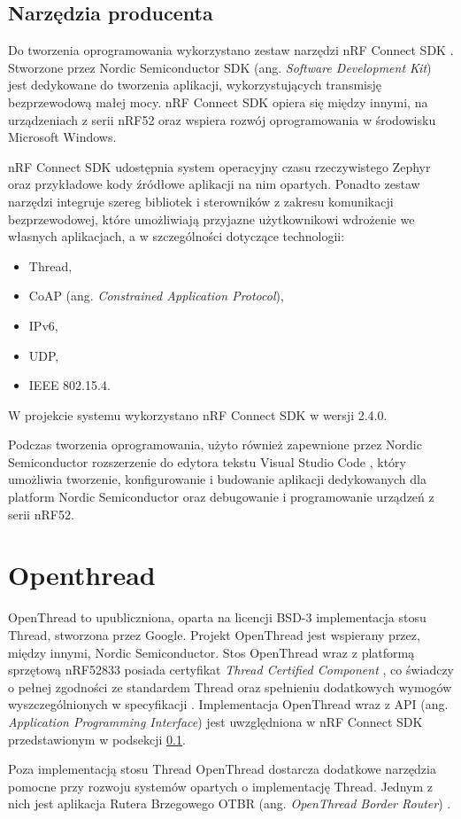 \subsection{Narzędzia producenta}
\label{subsec:producer-tools}

    Do tworzenia oprogramowania wykorzystano zestaw narzędzi nRF Connect SDK \cite{nrf-connect}. Stworzone przez Nordic Semiconductor SDK (ang. \textit{Software Development Kit}) jest dedykowane do tworzenia aplikacji, wykorzystujących transmisję bezprzewodową małej mocy. nRF Connect SDK opiera się między innymi, na urządzeniach z serii nRF52 oraz wspiera rozwój oprogramowania w środowisku Microsoft Windows.

    nRF Connect SDK udostępnia system operacyjny czasu rzeczywistego Zephyr oraz przykładowe kody źródłowe aplikacji na nim opartych. Ponadto zestaw narzędzi integruje szereg bibliotek i sterowników z zakresu komunikacji bezprzewodowej, które umożliwiają przyjazne użytkownikowi wdrożenie we własnych aplikacjach, a w szczególności dotyczące technologii:
    \begin{itemize}
        \item Thread,
        \item CoAP (ang. \textit{Constrained Application Protocol}),
        \item IPv6,
        \item UDP,
        \item IEEE 802.15.4.
    \end{itemize}

    W projekcie systemu wykorzystano nRF Connect SDK w wersji 2.4.0.

    Podczas tworzenia oprogramowania, użyto również zapewnione przez Nordic Semiconductor rozszerzenie do edytora tekstu Visual Studio Code \cite{nrf-ide}, który umożliwia tworzenie, konfigurowanie i budowanie aplikacji dedykowanych dla platform Nordic Semiconductor oraz debugowanie i programowanie urządzeń z serii nRF52. 

\section{Openthread}

    OpenThread to upubliczniona, oparta na licencji BSD-3 implementacja stosu Thread, stworzona przez Google. Projekt OpenThread jest wspierany przez, między innymi, Nordic Semiconductor. Stos OpenThread wraz z platformą sprzętową nRF52833 posiada certyfikat \textit{Thread Certified Component} \cite{nrf52833-tcc}, co świadczy o pełnej zgodności ze standardem Thread oraz spełnieniu dodatkowych wymogów wyszczególnionych w specyfikacji \cite{thread-1.3.0}. Implementacja OpenThread wraz z API (ang. \textit{Application Programming Interface}) jest uwzględniona w nRF Connect SDK przedstawionym w podsekcji \ref{subsec:producer-tools}.

    Poza implementacją stosu Thread OpenThread dostarcza dodatkowe narzędzia pomocne przy rozwoju systemów opartych o implementację Thread. Jednym z nich jest aplikacja Rutera Brzegowego OTBR (ang. \textit{OpenThread Border Router}) \cite{openthread-br}.